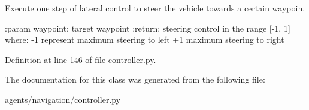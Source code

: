 \begin{DoxyVerb}Execute one step of lateral control to steer the vehicle towards a certain waypoin.

:param waypoint: target waypoint
:return: steering control in the range [-1, 1] where:
    -1 represent maximum steering to left
    +1 maximum steering to right
\end{DoxyVerb}
 

Definition at line 146 of file controller.\+py.



The documentation for this class was generated from the following file\+:\begin{DoxyCompactItemize}
\item 
agents/navigation/controller.\+py\end{DoxyCompactItemize}
